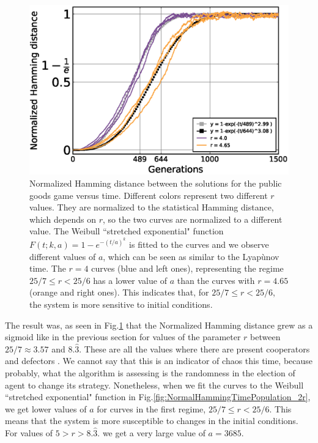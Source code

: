 \begin{figure}
	\centering
	\includegraphics[width=1\linewidth]{Images/P3/NormalHammingTimePopulation_2r.eps}
	\caption{Normalized Hamming distance between the solutions for the public goods game versus time. Different colors represent two different $r$ values. They are normalized to the statistical Hamming distance, which depends on $r$, so the two curves are normalized to a different value. The Weibull ``stretched exponential" function $F(t;k,a)=1-e^{-(t/a)^k}$ is fitted to the curves and we observe different values of $a$, which can be seen as similar to the Lyapùnov time. The $r=4$ curves (blue and left ones), representing the regime $25/7\leq r<25/6$ has a lower value of $a$ than the curves with $r=4.65$ (orange and right ones). This indicates that, for $25/7\leq r<25/6$, the system is more sensitive to initial conditions.}
	\label{fig:NormalHammingTimePopulation_r}
\end{figure}


The result was, as seen in Fig.\ref{fig:NormalHammingTimePopulation_r} that the Normalized Hamming distance grew as a sigmoid like in the previous section for values of the parameter $r$ between $25/7\approx3.57$ and $8.\hat3$. These are all the values where there are present cooperators and defectors . We cannot say that this is an indicator of chaos this time, because probably, what the algorithm is assessing is the randomness in the election of agent to change its strategy. Nonetheless, when we fit the curves to the Weibull ``stretched exponential" function in Fig.\ref{fig:NormalHammingTimePopulation_2r}, we get lower values of $a$ for curves in the first regime, $25/7\leq r<25/6$. This means that the system is more susceptible to changes in the initial conditions. For values of $5>r>8.\hat3.$ we get a very large value of $a = 3685$.


